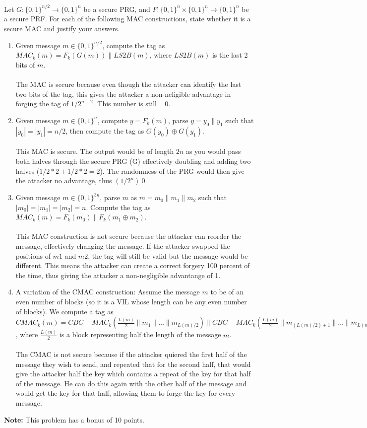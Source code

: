 \documentclass[12pt]{article}
\newcommand{\zo}{\{0,1\}}
\newcommand*\concat{\mathbin{\|}}
\begin{document}
\vspace{12pt}
Let $G:\zo^{n/2} \to \zo^{n}$ be a secure PRG, and $F:\zo^n \times \zo^n \to \zo^n$ be a secure PRF. For each of the following MAC constructions, state whether it is a secure MAC and justify your answers.
\begin{enumerate}
\item Given message $m \in \zo^{n/2}$, compute the tag as $MAC_k(m) = F_k(G(m)) \concat LS2B(m)$, where $LS2B(m)$ is the last 2 bits of $m$.
\\\\The MAC is secure because even though the attacker can identify the last two bits of the tag, this gives the attacker a non-neligible advantage in forging the tag of \(1/2^{n-2}\). This number is still ~ 0.
\item Given message $m \in \zo^{n}$, compute $y = F_k(m)$, parse $y = y_0 \concat y_1$ such that $|y_0| = |y_1| = n/2$, then compute the tag as $G(y_0)\oplus G(y_1)$.
\\\\This MAC is secure. The output would be of length $2n$ as you would pass both halves through the secure PRG (G) effectively doubling and adding two halves ($1/2*2 + 1/2*2 = 2$). The randomness of the PRG would then give the attacker no advantage, thus $(1/2^n) ~ 0$. 
\item Given message $m \in \zo^{3n}$, parse $m$ as $m = m_0 \concat m_1 \concat m_2$ such that $|m_0| = |m_1| = |m_2| = n$. Compute the tag as $MAC_k(m) = F_k(m_0) \concat F_k(m_1 \oplus m_2)$.
\\\\This MAC construction is not secure because the attacker can reorder the message, effectively changing the message. If the attacker swapped the positions of $m1$ and $m2$, the tag will still be valid but the message would be different. This means the attacker can create a correct forgery 100  percent of the time, thus giving the attacker a non-negligible advantange of 1.  
\item A variation of the CMAC construction: Assume the message $m$ to be of an even number of blocks (so it is a VIL whose length can be any even number of blocks). We compute a tag as $CMAC_k(m) = CBC-MAC_k(\frac{L(m)}{2} \concat m_1 \concat \dots \concat m_{L(m)/2}) \concat CBC-MAC_k(\frac{L(m)}{2} \concat m_{(L(m)/2) + 1} \concat \dots \concat m_{L(m)})$, where $\frac{L(m)}{2}$ is a block representing half the length of the message $m$.
\\\\The CMAC is not secure because if the attacker quiered the first half of the message they wish to send, and repeated that for the second half, that would give the attacker half the key which contains a repeat of the key for that half of the message. He can do this again with the other half of the message and would get the key for that half, allowing them to forge the key for every message.
\end{enumerate} 

\noindent\textbf{Note:} This problem has a bonus of 10 points.
\end{document}
